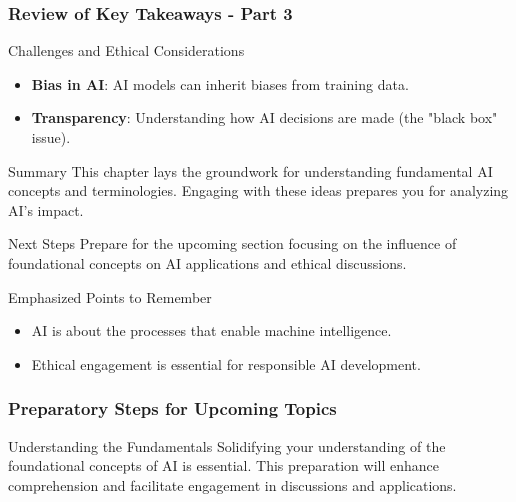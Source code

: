 \documentclass[aspectratio=169]{beamer}
\begin{document}
\begin{frame}[fragile]
    \frametitle{Review of Key Takeaways - Part 3}
    \begin{block}{Challenges and Ethical Considerations}
        \begin{itemize}
            \item \textbf{Bias in AI}: AI models can inherit biases from training data.
            \item \textbf{Transparency}: Understanding how AI decisions are made (the "black box" issue).
        \end{itemize}
    \end{block}

    \begin{block}{Summary}
        This chapter lays the groundwork for understanding fundamental AI concepts and terminologies. Engaging with these ideas prepares you for analyzing AI's impact.
    \end{block}

    \begin{block}{Next Steps}
        Prepare for the upcoming section focusing on the influence of foundational concepts on AI applications and ethical discussions.
    \end{block}

    \begin{block}{Emphasized Points to Remember}
        \begin{itemize}
            \item AI is about the processes that enable machine intelligence.
            \item Ethical engagement is essential for responsible AI development.
        \end{itemize}
    \end{block}
\end{frame}

\begin{frame}[fragile]
    \frametitle{Preparatory Steps for Upcoming Topics}
    \begin{block}{Understanding the Fundamentals}
        Solidifying your understanding of the foundational concepts of AI is essential. This preparation will enhance comprehension and facilitate engagement in discussions and applications.
    \end{block}
\end{frame}
\end{document}
